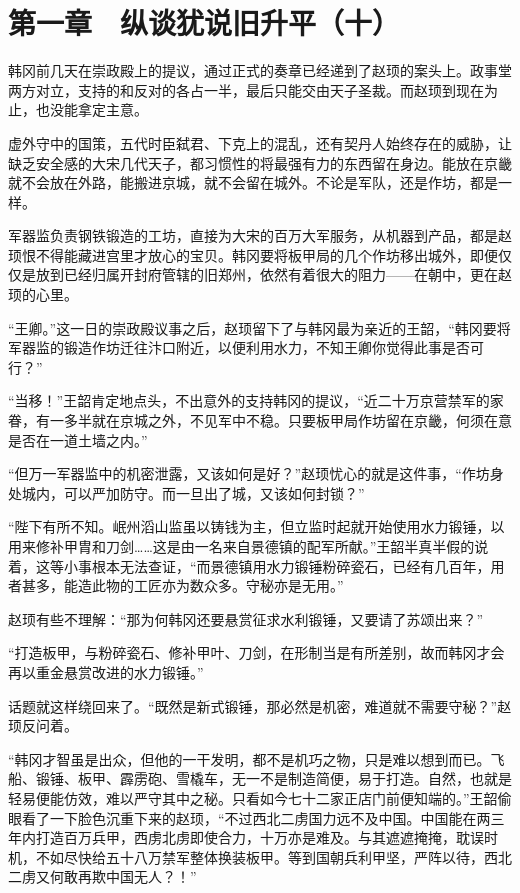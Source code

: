 \section{第一章　纵谈犹说旧升平（十）}

韩冈前几天在崇政殿上的提议，通过正式的奏章已经递到了赵顼的案头上。政事堂两方对立，支持的和反对的各占一半，最后只能交由天子圣裁。而赵顼到现在为止，也没能拿定主意。

虚外守中的国策，五代时臣弑君、下克上的混乱，还有契丹人始终存在的威胁，让缺乏安全感的大宋几代天子，都习惯性的将最强有力的东西留在身边。能放在京畿就不会放在外路，能搬进京城，就不会留在城外。不论是军队，还是作坊，都是一样。

军器监负责钢铁锻造的工坊，直接为大宋的百万大军服务，从机器到产品，都是赵顼恨不得能藏进宫里才放心的宝贝。韩冈要将板甲局的几个作坊移出城外，即便仅仅是放到已经归属开封府管辖的旧郑州，依然有着很大的阻力——在朝中，更在赵顼的心里。

“王卿。”这一日的崇政殿议事之后，赵顼留下了与韩冈最为亲近的王韶，“韩冈要将军器监的锻造作坊迁往汴口附近，以便利用水力，不知王卿你觉得此事是否可行？”

“当移！”王韶肯定地点头，不出意外的支持韩冈的提议，“近二十万京营禁军的家眷，有一多半就在京城之外，不见军中不稳。只要板甲局作坊留在京畿，何须在意是否在一道土墙之内。”

“但万一军器监中的机密泄露，又该如何是好？”赵顼忧心的就是这件事，“作坊身处城内，可以严加防守。而一旦出了城，又该如何封锁？”

“陛下有所不知。岷州滔山监虽以铸钱为主，但立监时起就开始使用水力锻锤，以用来修补甲胄和刀剑……这是由一名来自景德镇的配军所献。”王韶半真半假的说着，这等小事根本无法查证，“而景德镇用水力锻锤粉碎瓷石，已经有几百年，用者甚多，能造此物的工匠亦为数众多。守秘亦是无用。”

赵顼有些不理解：“那为何韩冈还要悬赏征求水利锻锤，又要请了苏颂出来？”

“打造板甲，与粉碎瓷石、修补甲叶、刀剑，在形制当是有所差别，故而韩冈才会再以重金悬赏改进的水力锻锤。”

话题就这样绕回来了。“既然是新式锻锤，那必然是机密，难道就不需要守秘？”赵顼反问着。

“韩冈才智虽是出众，但他的一干发明，都不是机巧之物，只是难以想到而已。飞船、锻锤、板甲、霹雳砲、雪橇车，无一不是制造简便，易于打造。自然，也就是轻易便能仿效，难以严守其中之秘。只看如今七十二家正店门前便知端的。”王韶偷眼看了一下脸色沉重下来的赵顼，“不过西北二虏国力远不及中国。中国能在两三年内打造百万兵甲，西虏北虏即使合力，十万亦是难及。与其遮遮掩掩，耽误时机，不如尽快给五十八万禁军整体换装板甲。等到国朝兵利甲坚，严阵以待，西北二虏又何敢再欺中国无人？！”

